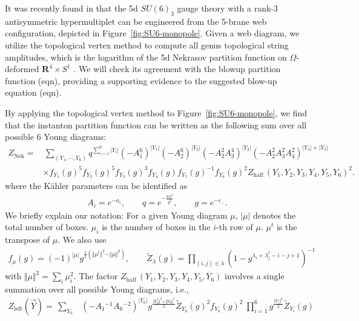 \documentclass[letterpaper, 11pt]{article}
\newcommand{\nn}{\nonumber}
\begin{document}
{It was recently found in \cite{Hayashi:2019yxj} that the 5d $SU(6)_3$ gauge theory with a rank-3 antisymmetric hypermultiplet can be engineered from the 5-brane web configuration, depicted in Figure~\ref{fig:SU6-monopole}. Given a web diagram, we utilize  the topological vertex method \cite{Aganagic:2003db,Iqbal:2007ii} to compute all genus topological string amplitudes, which is the logarithm of the 5d Nekrasov partition function on $\Omega$-deformed $\mathbf{R}^4\times S^1$ \cite{Gopakumar:1998jq}. We will check its agreement with the blowup partition function (eqn), providing a supporting evidence to the suggested blow-up equation (eqn).

By applying the topological vertex method to Figure~\ref{fig:SU6-monopole}, we find that the instanton partition function can be  written as the following sum over all possible 6 Young diagrams:
\begin{align}
  \label{eq:znek-su6}
  Z_{\text{Nek}} 
  =&\, \sum_{(Y_1, \cdots, Y_6)}q^{\sum_{i=1}^6|Y_i|} (-A_1^6)^{|Y_1|}(-A_2^6)^{|Y_2|}(-A_2^2A_3^4)^{|Y_3|}(-A_2^2A_3^2A_4^2)^{|Y_4| + |Y_5|}\nn\\
  &\times f_{Y_1}(g)^5f_{Y_2}(g)^5f_{Y_3}(g)^3f_{Y_4}(g)f_{Y_5}(g)^{-1}f_{Y_6}(g)^{2}Z_{\text{half}}\,(Y_1, Y_2, Y_3, Y_4, Y_5, Y_6)^2. 
  \end{align}
  where the K\"ahler parameters can be identified as 
\begin{align}
A_i = e^{-a_i}, \qquad q = e^{-\frac{8\pi^2}{g^2}}, \qquad g=e^{-\epsilon_-}.
\end{align}
We briefly explain our notation: For a given Young diagram $\mu$, $|\mu|$ denotes the total number of boxes. $\mu_i$ is the number of boxes in the $i$-th row of $\mu$. $\mu^t$ is the transpose of $\mu$. We also use
\begin{align}
f_\mu(g) = (-1)^{|\mu|}g^{\frac{1}{2}({\Vert \mu^t\Vert ^2 - \Vert \mu\Vert ^2})}, \qquad \tilde{Z}_{\lambda}(g) 
= \prod_{(i,j) \in \lambda} {(1 - g^{\lambda_i + \lambda^t_j - i - j +1} )^{-1}}
\end{align}
with $\Vert \mu \Vert^2   = \sum_{i} \mu_i^2$. The factor $Z_{\text{half}}\,(Y_1, Y_2, Y_3, Y_4, Y_5, Y_6)$ involves a single summation over all possible Young diagrams, i.e.,
\begin{align}
Z_{\text{left}}(\vec{Y})= \,
\sum_{Y_0} &( - A_1{}^{-1} A_6{}^{-2})^{|Y_0|} 
g^{\frac{\Vert Y_0^t\Vert ^2+\Vert Y_0\Vert ^2}{2}} \tilde{Z}_{Y_0}(g)^2 f_{Y_0}(g)^2
\ \textstyle\prod_{i=1}^6 g^{\frac{\Vert Y_i\Vert ^2}{2}} \tilde{Z}_{Y_i} (g)

\end{align}}
\end{document}
